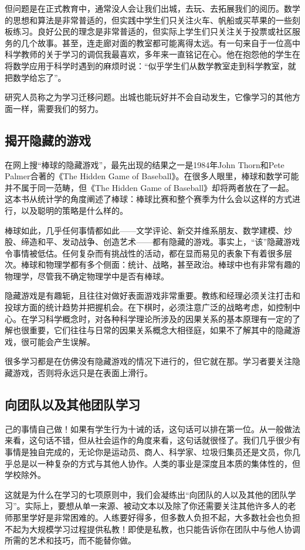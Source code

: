 但问题是在正式教育中，通常没人会让我们出城，去玩、去拓展我们的阅历。数学的思想和算法是非常普适的，但实践中学生们只关注火车、帆船或买苹果的一些刻板练习。良好公民的理念是非常普适的，但实际上学生们只关注关于投票或社区服务的几个故事。甚至，连走廊对面的教室都可能离得太远。有一句来自于一位高中科学教师的关于学习的调侃我最喜欢，多年来一直铭记在心。他在抱怨他的学生在将数学应用于科学时遇到的麻烦时说：“似乎学生们从数学教室走到科学教室，就把数学给忘了”。

研究人员称之为学习迁移问题。出城也能玩好并不会自动发生，它像学习的其他方面一样，需要我们的努力。

\subsection*{揭开隐藏的游戏}
在网上搜“棒球的隐藏游戏”，最先出现的结果之一是1984年John Thorn和Pete Palmer合著的《The Hidden Game of Baseball》。在很多人眼里，棒球和数学可能并不属于同一范畴，但《The Hidden Game of Baseball》却将两者放在了一起。这本书从统计学的角度阐述了棒球：棒球比赛和整个赛季为什么会以这样的方式进行，以及聪明的策略是什么样的。

棒球如此，几乎任何事情都如此——文学评论、新交并维系朋友、数学建模、炒股、缔造和平、发动战争、创造艺术——都有隐藏的游戏。事实上，“该”隐藏游戏令事情被低估。任何复杂而有挑战性的活动，都在显而易见的表象下有着很多层次。棒球和物理学都有多个侧面：统计、战略，甚至政治。棒球中也有非常有趣的物理学，尽管我不确定物理学中是否有棒球。

隐藏游戏是有趣轭，且往往对做好表面游戏非常重要。教练和经理必须关注打击和投球方面的统计趋势并把握机会。在下棋时，必须注意广泛的战略考虑，如控制中心。在学习科学概念时，对各种科学理论所涉及的因果关系的基本原理有一定的了解也很重要，它们往往与日常的因果关系概念大相径庭，如果不了解其中的隐藏游戏，很可能会产生误解。

很多学习都是在仿佛没有隐藏游戏的情况下进行的，但它就在那。学习者要关注隐藏游戏，否则将永远只是在表面上滑行。

\subsection*{向团队以及其他团队学习}
己的事情自己做！如果有学生行为十诫的话，这句话可以排在第一位。从一般做法来看，这句话不错，但从社会运作的角度来看，这句话就很怪了。我们几乎很少有事情是独自完成的，无论你是运动员、商人、科学家、垃圾归集员还是文员，你几乎总是以一种复杂的方式与其他人协作。人类的事业是深度且本质的集体性的，但学校除外。

这就是为什么在学习的七项原则中，我们会凝练出“向团队的人以及其他的团队学习”。实际上，要想从单一来源、被动文本以及除了你还需要关注其他许多人的老师那里学好是非常困难的。人练要好得多，但多数人负担不起，大多数社会也负担不起为大规模学习过程提供私教！即使是私教，也只能告诉你在团队中与他人协调所需的艺术和技巧，而不能替你做。

